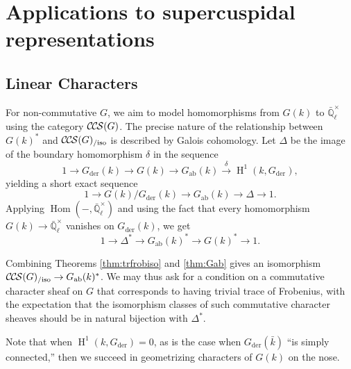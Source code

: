 \documentclass[10pt]{amsart}
\theoremstyle{plain}
\newtheorem{corollary}[theorem]{Corollary}
\theoremstyle{definition}
\newcommand{\EE}{\mathbb{\bar Q}_\ell}
\newcommand{\bFq}{\bar{k}}
\newcommand{\Fq}{k}
\newcommand{\EEx}{\EE^\times}
\DeclareMathOperator{\Hom}{Hom}
\DeclareMathOperator{\Hh}{H}
\newcommand{\der}{_{\operatorname{der}}}
\newcommand{\ab}{_{\operatorname{ab}}}
\newcommand{\iso}{{\ \cong\ }}
\newcommand{\CCS}{{\mathcal{C\hskip-.8pt C\hskip-0.8pt S}}}
\newcommand{\CCSiso}[1]{\CCS(#1)_{/\text{iso}}}
\begin{document}
\section{Applications to supercuspidal representations}

\subsection{Linear Characters}

For non-commutative $G$, we aim to model homomorphisms from $G(k)$ to $\EEx$ using the category $\CCS(G)$.
The precise nature of the relationship between $G(k)^*$ and $\CCSiso{G}$ is described by Galois cohomology.
Let $\Delta$ be the image of the boundary homomorphism $\delta$ in the sequence
\[
1 \to G\der(k) \to G(k) \to G\ab(k) \xrightarrow{\delta} \Hh^1(k, G\der),
\]
yielding a short exact sequence
\[
1 \to G(k) / G\der(k) \to G\ab(k) \to \Delta \to 1.
\]
Applying $\Hom(-, \EEx)$ and using the fact that every homomorphism $G(k) \to \EEx$ vanishes on $G\der(k)$, we get
\[
1 \to \Delta^* \to G\ab(k)^* \to G(k)^* \to 1.
\]

Combining Theorems \ref{thm:trfrobiso} and \ref{thm:Gab} gives an isomorphism $\CCSiso{G} \to G\ab(k)^*$.
We may thus ask for a condition on a commutative character sheaf on $G$ that corresponds to having trivial
trace of Frobenius, with the expectation that the isomorphism classes of such commutative character sheaves
should be in natural bijection with $\Delta^*$.

Note that when $\Hh^1(k,G\der) = 0$, as is the case when $G\der(\bFq)$ ``is simply connected,'' then
we succeed in geometrizing characters of $G(k)$ on the nose.

% 
\end{document}
